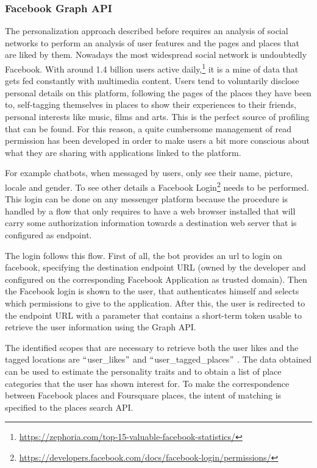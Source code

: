 \subsubsection{Facebook Graph API}
The personalization approach described before requires an analysis of social networks to perform an analysis of user features and the pages and places that are liked by them. Nowadays the most widespread social network is undoubtedly Facebook. With around 1.4 billion users active daily,\footnote{\url{https://zephoria.com/top-15-valuable-facebook-statistics/}} it is a mine of data that gets fed constantly with multimedia content. Users tend to voluntarily disclose personal details on this platform, following the pages of the places they have been to, self-tagging themselves in places to show their experiences to their friends, personal interests like music, films and arts. This is the perfect source of profiling that can be found. For this reason, a quite cumbersome management of read permission has been developed in order to make users a bit more conscious about what they are sharing with applications linked to the platform.

For example chatbots, when messaged by users, only see their name, picture, locale and gender. To see other details a Facebook Login\footnote{\url{https://developers.facebook.com/docs/facebook-login/permissions/}} needs to be performed. This login can be done on any messenger platform because the procedure is handled by a flow that only requires to have a web browser installed that will carry some authorization information towards a destination web server that is configured as endpoint.

The login follows this flow. First of all, the bot provides an url to login on facebook, specifying the destination endpoint URL (owned by the developer and configured on the corresponding Facebook Application as trusted domain). Then the Facebook login is shown to the user, that authenticates himself and selects which permissions to give to the application. After this, the user is redirected to the endpoint URL with a parameter that contains a short-term token usable to retrieve the user information using the Graph API.

The identified scopes that are necessary to retrieve both the user likes and the tagged locations are $``$user\_likes$"$  and $``$user\_tagged\_places$"$ . The data obtained can be used to estimate the personality traits and to obtain a list of place categories that the user has shown interest for. To make the correspondence between Facebook places and Foursquare places, the intent of matching is specified to the places search API.

